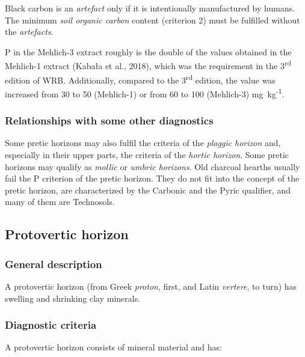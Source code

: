 \documentclass[
  letterpaper,
  DIV=11,
  numbers=noendperiod]{scrreprt}
\begin{document}
Black carbon is an \emph{artefact} only if it is intentionally
manufactured by humans. The minimum \emph{soil organic carbon} content
(criterion 2) must be fulfilled without the \emph{artefacts}.

P in the Mehlich-3 extract roughly is the double of the values obtained
in the Mehlich-1 extract (Kabała et al., 2018), which was the
requirement in the 3\textsuperscript{rd} edition of WRB. Additionally,
compared to the 3\textsuperscript{rd} edition, the value was increased
from 30 to 50 (Mehlich-1) or from 60 to 100 (Mehlich-3)
mg~kg\textsuperscript{-1}.

\hypertarget{relationships-with-some-other-diagnostics-30}{%
\subsubsection{Relationships with some other
diagnostics}\label{relationships-with-some-other-diagnostics-30}}

Some pretic horizons may also fulfil the criteria of the \emph{plaggic
horizon} and, especially in their upper parts, the criteria of the
\emph{hortic horizon}. Some pretic horizons may qualify as \emph{mollic}
or \emph{umbric horizons}. Old charcoal hearths usually fail the P
criterion of the pretic horizon. They do not fit into the concept of the
pretic horizon, are characterized by the Carbonic and the Pyric
qualifier, and many of them are Technosols.

\hypertarget{protovertic-horizon}{%
\subsection{Protovertic horizon}\label{protovertic-horizon}}

\hypertarget{general-description-31}{%
\subsubsection{General description}\label{general-description-31}}

A protovertic horizon (from Greek \emph{proton}, first, and Latin
\emph{vertere}, to turn) has swelling and shrinking clay minerals.

\hypertarget{diagnostic-criteria-31}{%
\subsubsection{Diagnostic criteria}\label{diagnostic-criteria-31}}

A protovertic horizon consists of mineral material and has:
\end{document}
